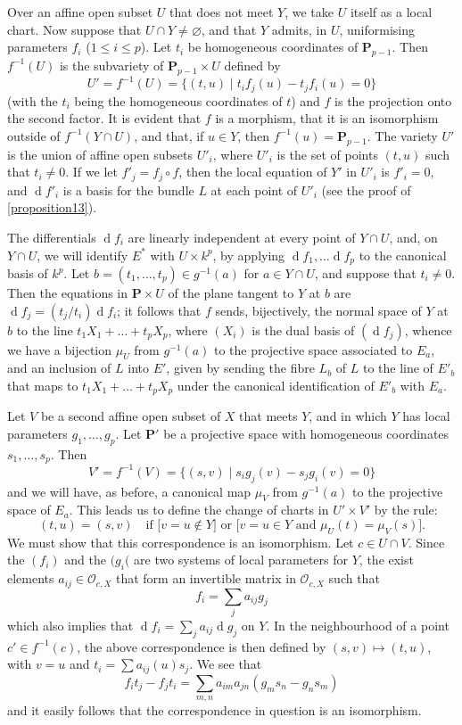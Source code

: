 \documentclass{article}
\theoremstyle{plain}
\theoremstyle{definition}
\newcommand{\sh}[1]{{\mathscr{#1}}}
\newcommand{\PP}{\mathbf{P}}
\newcommand{\dd}{\operatorname{d}\!}
\renewcommand{\leq}{\leqslant}
\newcommand{\oldpage}[1]{\marginpar{\footnotesize$\Big\vert$ \textit{p.~#1}}}
\begin{document}
Over an affine open subset $U$ that does not meet $Y$, we take $U$ itself as a local chart.
Now suppose that $U\cap Y\neq\varnothing$, and that $Y$ admits, in $U$, uniformising parameters $f_i$ ($1\leq i\leq p$).
Let $t_i$ be homogeneous coordinates of $\PP_{p-1}$.
Then $f^{-1}(U)$ is the subvariety of $\PP_{p-1}\times U$ defined by
\[
  U' = f^{-1}(U) = \big\{(t,u) \mid t_if_j(u)-t_jf_i(u)=0\big\}
\]
(with the $t_i$ being the homogeneous coordinates of $t$) and $f$ is the projection onto the second factor.
It is evident that $f$ is a morphism, that it is an isomorphism outside of $f^{-1}(Y\cap U)$, and that, if $u\in Y$, then $f^{-1}(u)=\PP_{p-1}$.
The variety $U'$ is the union of affine open subsets $U'_i$, where $U'_i$ is the set of points $(t,u)$ such that $t_i\neq 0$.
If we let $f'_j=f_j\circ f$, then the local equation of $Y'$ in $U'_i$ is $f'_i=0$, and $\dd f'_i$ is a basis for the bundle $L$ at each point of $U'_i$ (see the proof of \cref{proposition13}).

The differentials $\dd f_i$ are linearly independent at every point of $Y\cap U$, and, on $Y\cap U$, we will identify $E^*$ with $U\times k^p$, by applying $\dd f_1,\ldots\dd f_p$ to the canonical basis of $k^p$.
Let $b=(t_1,\ldots,t_p)\in g^{-1}(a)$ for $a\in Y\cap U$, and suppose that $t_i\neq 0$.
Then the equations in $\PP\times U$ of the plane tangent to $Y$ at $b$ are $\dd f_j=(t_j/t_i)\dd f_i$;
it follows that $f$ sends, bijectively, the normal space of $Y$ at $b$ to the line $t_1X_1+\ldots+t_pX_p$, where $(X_i)$ is the dual basis of $(\dd f_j)$, whence we have a bijection $\mu_U$ from $g^{-1}(a)$ to the projective space associated to $E_a$, and an inclusion of $L$ into $E'$, given by sending the fibre $L_b$ of $L$ to the line of $E'_b$ that maps to $t_1X_1+\ldots+t_pX_p$ under the canonical identification of $E'_b$ with $E_a$.

Let $V$ be a second affine open subset of $X$ that meets $Y$, and in which $Y$ has local parameters $g_1,\ldots,g_p$.
Let $\PP'$ be a projective space with homogeneous coordinates $s_1,\ldots,s_p$.
Then
\[
  V' = f^{-1}(V) = \big\{(s,v) \mid s_ig_j(v)-s_jg_i(v)=0\big\}
\]
and we will have, as before, a canonical map $\mu_V$ from $g^{-1}(a)$ to the projective space of $E_a$.
This leads us to define the change of charts in $U'\times V'$ by the rule:
\[
  (t,u) = (s,v)
  \quad\mbox{if [$v=u\not\in Y$] or [$v=u\in Y$ and $\mu_U(t)=\mu_V(s)$].}
\]
We must show that this correspondence is an isomorphism.
Let $c\in U\cap V$.
Since the $(f_i)$ and the $(g_i($ are two systems of local parameters for $Y$, the exist elements $a_{ij}\in\sh{O}_{c,X}$ that form an invertible matrix in $\sh{O}_{c,X}$
\oldpage{127}
such that
\[
  f_i = \sum_j a_{ij}g_j
\]
which also implies that $\dd f_i = \sum_j a_{ij}\dd g_j$ on $Y$.
In the neighbourhood of a point $c'\in f^{-1}(c)$, the above correspondence is then defined by $(s,v)\mapsto(t,u)$, with $v=u$ and $t_i=\sum a_{ij}(u)s_j$.
We see that
\[
  f_it_j-f_jt_i = \sum_{m,n} a_{im}a_{jn}(g_ms_n-g_ns_m)
\]
and it easily follows that the correspondence in question is an isomorphism.
\end{document}
